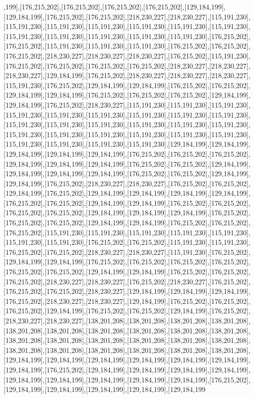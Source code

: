 ,199],[176,215,202],[176,215,202],[176,215,202],[176,215,202],[129,184,199],[129,184,199],[176,215,202],[176,215,202],[218,230,227],[218,230,227],[115,191,230],[115,191,230],[115,191,230],[115,191,230],[115,191,230],[115,191,230],[115,191,230],[115,191,230],[115,191,230],[115,191,230],[115,191,230],[115,191,230],[176,215,202],[176,215,202],[115,191,230],[115,191,230],[115,191,230],[176,215,202],[176,215,202],[176,215,202],[218,230,227],[218,230,227],[218,230,227],[176,215,202],[115,191,230],[176,215,202],[176,215,202],[176,215,202],[176,215,202],[218,230,227],[218,230,227],[218,230,227],[129,184,199],[176,215,202],[218,230,227],[218,230,227],[218,230,227],[115,191,230],[176,215,202],[129,184,199],[129,184,199],[176,215,202],[176,215,202],[129,184,199],[129,184,199],[176,215,202],[176,215,202],[176,215,202],[129,184,199],[129,184,199],[176,215,202],[218,230,227],[115,191,230],[115,191,230],[115,191,230],[115,191,230],[115,191,230],[115,191,230],[115,191,230],[115,191,230],[115,191,230],[115,191,230],[115,191,230],[115,191,230],[115,191,230],[115,191,230],[115,191,230],[115,191,230],[115,191,230],[115,191,230],[115,191,230],[115,191,230],[115,191,230],[115,191,230],[115,191,230],[115,191,230],[115,191,230],[129,184,199],[129,184,199],[129,184,199],[129,184,199],[129,184,199],[176,215,202],[176,215,202],[176,215,202],[129,184,199],[129,184,199],[129,184,199],[176,215,202],[176,215,202],[129,184,199],[129,184,199],[129,184,199],[129,184,199],[176,215,202],[176,215,202],[129,184,199],[129,184,199],[176,215,202],[218,230,227],[218,230,227],[176,215,202],[176,215,202],[129,184,199],[176,215,202],[129,184,199],[129,184,199],[129,184,199],[129,184,199],[176,215,202],[176,215,202],[129,184,199],[129,184,199],[176,215,202],[176,215,202],[176,215,202],[176,215,202],[129,184,199],[129,184,199],[129,184,199],[176,215,202],[176,215,202],[176,215,202],[129,184,199],[129,184,199],[176,215,202],[176,215,202],[176,215,202],[115,191,230],[115,191,230],[115,191,230],[115,191,230],[115,191,230],[115,191,230],[115,191,230],[176,215,202],[176,215,202],[115,191,230],[115,191,230],[176,215,202],[176,215,202],[218,230,227],[218,230,227],[115,191,230],[176,215,202],[129,184,199],[129,184,199],[176,215,202],[176,215,202],[176,215,202],[176,215,202],[176,215,202],[176,215,202],[129,184,199],[129,184,199],[176,215,202],[176,215,202],[176,215,202],[218,230,227],[218,230,227],[176,215,202],[218,230,227],[176,215,202],[176,215,202],[176,215,202],[218,230,227],[129,184,199],[129,184,199],[129,184,199],[176,215,202],[218,230,227],[218,230,227],[129,184,199],[176,215,202],[176,215,202],[176,215,202],[129,184,199],[176,215,202],[176,215,202],[129,184,199],[176,215,202],[218,230,227],[218,230,227],[138,201,208],[138,201,208],[138,201,208],[138,201,208],[138,201,208],[138,201,208],[138,201,208],[138,201,208],[138,201,208],[138,201,208],[138,201,208],[138,201,208],[138,201,208],[138,201,208],[138,201,208],[138,201,208],[138,201,208],[138,201,208],[138,201,208],[138,201,208],[138,201,208],[138,201,208],[129,184,199],[129,184,199],[129,184,199],[129,184,199],[129,184,199],[129,184,199],[129,184,199],[176,215,202],[129,184,199],[129,184,199],[129,184,199],[129,184,199],[129,184,199],[129,184,199],[129,184,199],[129,184,199],[129,184,199],[176,215,202],[129,184,199],[129,184,199],[129,184,199],[129,184,199],[129,184,199